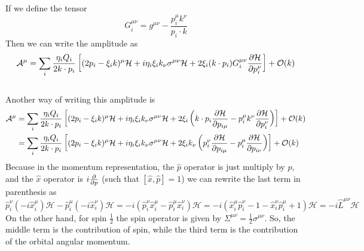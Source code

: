 \documentclass{article}
\begin{document}
If we define the tensor
\begin{equation}
	G_i^{\mu\nu}
	= g^{\mu\nu} - \frac{p_i^\mu k^\nu}{p_i\cdot k}
\end{equation}
Then we can write the amplitude as
\begin{equation}\label{ANLP}
	\mathcal{A}^\mu
	= \sum_i \frac{\eta_i Q_i}{2k \cdot p_i}
	\left[
		(2p_i - \xi_i k)^\mu \mathcal{H}
		+ i\eta_i \xi_i k_\nu \sigma^{\mu\nu} \mathcal{H}
		+ 2\xi_i (k \cdot p_i) G_i^{\mu \nu} \pdv{\mathcal{H}}{p_{i}^\nu}
	\right]
	+ \order{k}
\end{equation}
\\
Another way of writing this amplitude is
\begin{align*}
	\mathcal{A}^\mu &
	= \sum_i \frac{\eta_i Q_i}{2k \cdot p_i}
	\left[
		(2p_i - \xi_i k)^\mu \mathcal{H}
		+ i\eta_i \xi_i k_\nu \sigma^{\mu\nu} \mathcal{H}
		+ 2\xi_i
		\left(
			k \cdot p_i \pdv{\mathcal{H}}{p_{i\mu}}
			- p_i^\mu k^\nu \pdv{\mathcal{H}}{p_i^\nu}
		\right)
	\right]
	+ \order{k}\\&
	= \sum_i \frac{\eta_i Q_i}{2k \cdot p_i}
	\left[
		(2p_i - \xi_i k)^\mu \mathcal{H}
		+ i\eta_i \xi_i k_\nu \sigma^{\mu\nu} \mathcal{H}
		+ 2\xi_i k_\nu
		\left(
			p^\nu_i \pdv{\mathcal{H}}{p_{i\mu}} - p_i^\mu \pdv{\mathcal{H}}{p_{i\nu}}
		\right)
	\right]+\order{k}
\end{align*}
Because in the momentum representation, the $\hat{p}$ operator is just multiply by $p$,
and the $\hat{x}$ operator is $i\pdv{p}$ (such that $[\hat{x}, \hat{p}]=1$)
we can rewrite the last term in parenthesis as
\begin{equation}
	\hat{p}^\nu_i(-i\hat{x}^\mu_i) \mathcal{H}
	- \hat{p}^\mu_i (-i\hat{x}^\nu_i) \mathcal{H}
	= -i\left(\hat{p}^\nu_i \hat{x}^\mu_i - \hat{p}^\mu_i \hat{x}^\nu_i\right)
	\mathcal{H}
	= -i\left(\hat{x}^\mu_i \hat{p}^\nu_i - 1 - \hat{x}^\nu_i \hat{p}^\mu_i + 1\right)
	\mathcal{H}
	= -i\hat{L}^{\mu\nu} \mathcal{H}
\end{equation}
On the other hand, for spin $\frac{1}{2}$ the spin operator is given by
$\Sigma^{\mu\nu}=\frac{1}{2}\sigma^{\mu\nu}$.
So, the middle term is the contribution of spin,
while the third term is the contribution of the orbital angular momentum.
\end{document}
